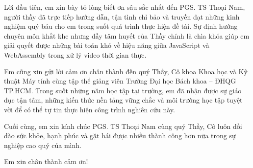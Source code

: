
Lời đầu tiên, em xin bày tỏ lòng biết ơn sâu sắc nhất đến PGS. TS Thoại Nam, người thầy đã trực tiếp hướng dẫn, tận tình chỉ bảo và truyền đạt những kinh nghiệm quý báu cho em trong suốt quá trình thực hiện đề tài. Sự định hướng chuyên môn khắt khe nhưng đầy tâm huyết của Thầy chính là chìa khóa giúp em giải quyết được những bài toán khó về hiệu năng giữa JavaScript và WebAssembly trong xử lý video thời gian thực.


Em cũng xin gửi lời cảm ơn chân thành đến quý Thầy, Cô khoa Khoa học và Kỹ thuật Máy tính cùng tập thể giảng viên Trường Đại học Bách khoa – ĐHQG TP.HCM. Trong suốt những năm học tập tại trường, em đã nhận được sự giáo dục tận tâm, những kiến thức nền tảng vững chắc và môi trường học tập tuyệt vời để có thể tự tin thực hiện công trình nghiên cứu này.


Cuối cùng, em xin kính chúc PGS. TS Thoại Nam cùng quý Thầy, Cô luôn dồi dào sức khỏe, hạnh phúc và gặt hái được nhiều thành công hơn nữa trong sự nghiệp cao quý của mình.


Em xin chân thành cảm ơn!
